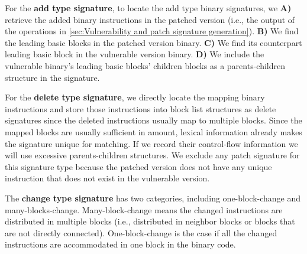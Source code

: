 For the \textbf{add type signature}, to locate the add type binary signatures, we \textbf{A)} retrieve the added binary instructions in the patched version (i.e., the output of the operations in \autoref{sec:Vulnerability and patch signature generation}). 
\textbf{B)} We find the leading basic blocks in the patched version binary.
\textbf{C)} We find its counterpart leading basic block in the vulnerable version binary. 
\textbf{D)} We include the vulnerable binary's leading basic blocks' children blocks as a parents-children structure in the signature. 


For the \textbf{delete type signature}, we directly locate the mapping binary instructions and store those instructions into block list structures as delete signatures since the deleted instructions usually map to multiple blocks. Since the mapped blocks are usually sufficient in amount, lexical information already makes the signature unique for matching. If we record their control-flow information we will use excessive parents-children structures. 
We exclude any patch signature for this signature type because the patched version does not have any unique instruction that does not exist in the vulnerable version.


The \textbf{change type signature} has two categories, including one-block-change and many-blocks-change. 
Many-block-change means the changed instructions are distributed in multiple blocks (i.e., distributed in neighbor blocks or blocks that are not directly connected). 
One-block-change is the case if all the changed instructions are accommodated in one block in the binary code. 


